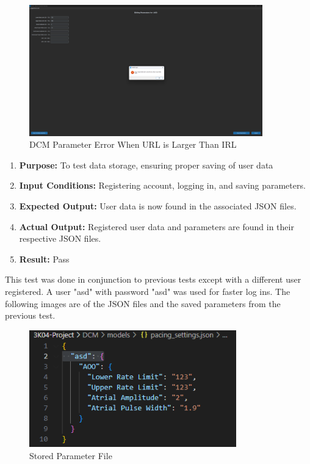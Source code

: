 \documentclass{article}
\newcounter{subsubsubsection}[subsubsection]
\begin{document}
\begin{tcolorbox}
    \begin{figure}[H]\label{urlirl}
        \centering
        \includegraphics[width=0.9\textwidth]{urlirl.png}
        \caption{DCM Parameter Error When URL is Larger Than IRL}
    \end{figure}
\end{tcolorbox}

\newpage
{}
\begin{enumerate}[label=]
   \item \textbf{Purpose:} To test data storage, ensuring proper saving of user data
   \item \textbf{Input Conditions:} Registering account, logging in, and saving parameters.
   \item \textbf{Expected Output:} User data is now found in the associated JSON files.
   \item \textbf{Actual Output:}  Registered user data and parameters are found in their respective JSON files.
   \item \textbf{Result:} Pass
\end{enumerate}

This test was done in conjunction to previous tests except with a different user registered. A user "asd" 
with password "asd" was used for faster log ins. The following images are of the JSON files and the saved parameters 
from the previous test. 

\begin{tcolorbox}
    \begin{figure}[H]\label{savedparams}
        \centering
        \includegraphics[width=0.8\textwidth]{savedparams.png}
        \caption{Stored Parameter File}
    \end{figure}
\end{tcolorbox}
\end{document}
